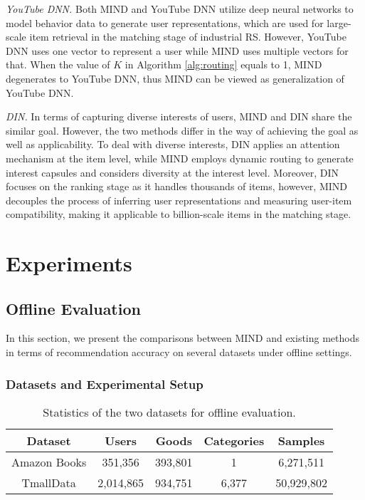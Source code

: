 \documentclass[sigconf]{acmart}
\begin{document}
\textit{YouTube DNN.}
Both MIND and YouTube DNN utilize deep neural networks to model behavior data to generate user representations, which are used for large-scale item retrieval in the matching stage of industrial RS.
However, YouTube DNN uses one vector to represent a user while MIND uses multiple vectors for that.
When the value of $K$ in Algorithm \ref{alg:routing} equals to 1, MIND degenerates to YouTube DNN, thus MIND can be viewed as generalization of YouTube DNN.

\textit{DIN.}
In terms of capturing diverse interests of users, MIND and DIN share the similar goal.
However, the two methods differ in the way of achieving the goal as well as applicability.
To deal with diverse interests, DIN applies an attention mechanism at the item level, while MIND employs dynamic routing to generate interest capsules and considers diversity at the interest level.
Moreover, DIN focuses on the ranking stage as it handles thousands of items, however, MIND decouples the process of inferring user representations and measuring user-item compatibility, making it applicable to billion-scale items in the matching stage.


\section{Experiments}

\subsection{Offline Evaluation}
In this section, we present the comparisons between MIND and existing methods in terms of recommendation accuracy on several datasets under offline settings.

\subsubsection{Datasets and Experimental Setup}

\begin{table}[]
  \centering
  \caption{Statistics of the two datasets for offline evaluation.}
  \label{dataset:statistics}
  \begin{tabular}{ccccc}
    \toprule
    Dataset & Users & Goods & Categories & Samples \\ \hline
    Amazon Books & 351,356  & 393,801 & 1 & 6,271,511 \\ \hline
    TmallData & 2,014,865 & 934,751 & 6,377 & 50,929,802 \\ \bottomrule
  \end{tabular}
\end{table}
\end{document}

